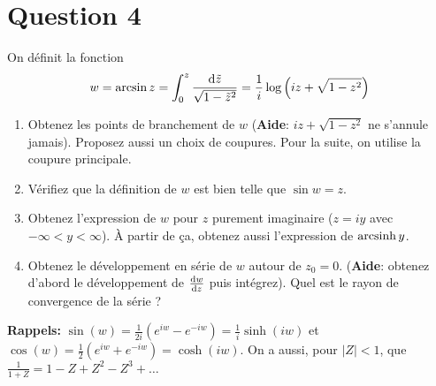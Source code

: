 
\section*{Question 4}
On définit la fonction
\[ w = \arcsin z =
  \int_0^z \frac{\operatorname{d}\! \tilde{z}}{\sqrt{1-\tilde{z}^2}} =
  \frac{1}{i} \log\left(iz + \sqrt{1-z^2}\right)
\]
\begin{enumerate}
  \item Obtenez les points de branchement de $w$
    (\textbf{Aide}: $iz + \sqrt{1 - z^2}$ ne s'annule jamais).
    Proposez aussi un choix de coupures.
    Pour la suite, on utilise la coupure principale.
  \item Vérifiez que la définition de $w$ est bien telle que $\sin w = z$.
  \item Obtenez l'expression de $w$ pour $z$ purement imaginaire
    ($z = iy$ avec $-\infty < y < \infty$).
    À partir de ça, obtenez aussi l'expression de $\operatorname{arcsinh} y$.
  \item Obtenez le développement en série de $w$ autour de $z_0 = 0$.
    (\textbf{Aide}: obtenez d'abord le développement de
    $\frac{\operatorname{d}\! w}{\operatorname{d}\! z}$ puis intégrez).
    Quel est le rayon de convergence de la série ?
\end{enumerate}
\textbf{Rappels:} $\sin(w) = \frac{1}{2i}\left(e^{iw}-e^{-iw}\right)
= \frac{1}{i}\sinh(iw)$ et
$\cos(w) = \frac{1}{2}\left(e^{iw}+e^{-iw}\right) = \cosh(iw)$.
On a aussi, pour $|Z| < 1$, que
$\frac{1}{1+Z} = 1 - Z + Z^2 - Z^3 + \ldots$

